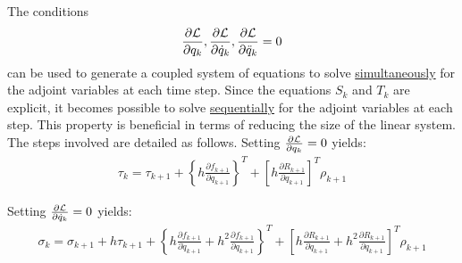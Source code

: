 \documentclass{beamer}
\newcommand{\pd}[2]{\frac{\partial #1}{\partial #2}}
\begin{document}
\begin{frame}[allowframebreaks]
{    The conditions $$\pd{\cal{L}}{{q}_k}, \pd{\cal{L}}{\dot{q}_k},
    \pd{\cal{L}}{\ddot{q}_k} = 0$$ can be used to generate a coupled
    system of equations to solve \underline{simultaneously} for the
    adjoint variables at each time step. Since the equations $S_k$ and
    $T_k$ are explicit, it becomes possible to solve
    \underline{sequentially} for the adjoint variables at each step. This property
    is beneficial in terms of reducing the size of the linear system.
    The steps involved are detailed as follows.
         Setting $\pd{\cal{L}}{{q}_k} = 0$ yields:
         \begin{equation}
           \begin{split}
             \tau_k = \tau_{k+1} + \left\{h \pd{f_{k+1}}{{q}_{k+1}} \right\}^T + \left[ h \pd{R_{k+1}}{{q}_{k+1}} \right]^T \rho_{k+1}  
           \end{split}
         \end{equation}

    Setting $\pd{\cal{L}}{\dot{q}_k} = 0$ yields:
         \begin{equation}
           \begin{split}
             \sigma_k = \sigma_{k+1} + h \tau_{k+1}  + \left\{ h \pd{f_{k+1}}{\dot{q}_{k+1}} +  h^2 \pd{f_{k+1}}{{q}_{k+1}} \right\}^T + \left[ h \pd{R_{k+1}}{\dot{q}_{k+1}} +  h^2 \pd{R_{k+1}}{{q}_{k+1}} \right]^T \rho_{k+1} 
           \end{split}
         \end{equation}
         
}
\end{frame}
\end{document}
